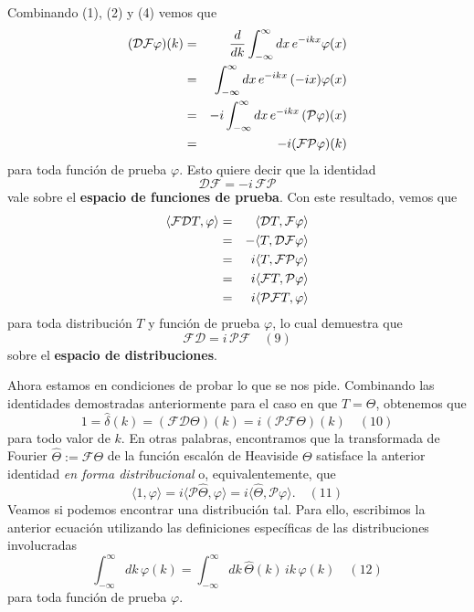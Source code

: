 \documentclass[11pt,spanish]{article}
\newcommand{\four}{\mathcal{F}}
\newcommand{\powr}{\mathcal{P}}
\newcommand{\derv}{\mathcal{D}}
\begin{document}
Combinando (1), (2) y (4) vemos que
\begin{eqnarray}
(\derv\four \varphi)(k)
&=&
\frac{d}{dk}
\int_{-\infty}^{\infty} dx\,
e^{-ikx}
\varphi(x)
\notag
\\
&=&
\int_{-\infty}^{\infty} dx\,
e^{-ikx}\,
(-ix)
\varphi(x)
\notag
\\
&=&
-
i
\int_{-\infty}^{\infty} dx\,
e^{-ikx}\,
(\powr \varphi)(x)
\notag
\\
&=&
-i
(\four\powr\varphi)(k)
\notag
\end{eqnarray}
para toda funci\'on de prueba $\varphi$.
Esto quiere decir que la identidad
$$
\derv\four
=
-
i\,\four\powr
$$
vale sobre el {\bf espacio de funciones de prueba}.
Con este resultado, vemos que
\begin{eqnarray}
\langle \four\derv T , \varphi \rangle
&=&
\langle \derv T , \four \varphi \rangle
\notag
\\
&=&
-\langle T , \derv \four \varphi \rangle
\notag
\\
&=&
i
\langle T , \four \powr \varphi \rangle
\notag
\\
&=&
i
\langle \four T , \powr \varphi \rangle
\notag
\\
&=&
i
\langle \powr \four T , \varphi \rangle
\notag
\end{eqnarray}
para toda distribuci\'on $T$ y funci\'on de prueba $\varphi$, lo cual demuestra que
$$
\four\derv = i\, \powr\four
\quad (9)
$$
sobre el {\bf espacio de distribuciones}.

Ahora estamos en condiciones de probar lo que se nos pide.
Combinando las identidades demostradas anteriormente para el caso en que $T=\Theta$, obtenemos que
$$
1
=
\hat{\delta}(k)
=
(\four \derv \Theta)(k)
=
i\,(\powr \four \Theta)(k)
\quad (10)
$$
para todo valor de $k$.
En otras palabras, encontramos que la transformada de Fourier $\hat{\Theta}:=\four \Theta$ de la funci\'on escal\'on de Heaviside $\Theta$ satisface la anterior identidad {\em en forma distribucional} o, equivalentemente, que
$$
\langle 1 , \varphi \rangle
=
i \langle \powr \hat{\Theta} , \varphi \rangle
=
i \langle \hat{\Theta} , \powr \varphi \rangle.
\quad (11)
$$
Veamos si podemos encontrar una distribuci\'on tal.
Para ello, escribimos la anterior ecuaci\'on utilizando las definiciones espec\'ificas de las distribuciones involucradas
$$
\int_{-\infty}^{\infty} 
dk\, 
\varphi(k)
=
\int_{-\infty}^{\infty} 
dk\, 
\hat{\Theta}(k)\,
ik\,
\varphi(k)
\quad (12)
$$
para toda funci\'on de prueba $\varphi$.
\end{document}
